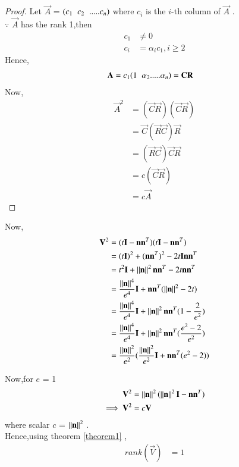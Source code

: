 \documentclass[journal,12pt,twocolumn]{IEEEtran}
\begin{document}
\begin{proof}
Let $\vec{A}$ = $(c_1 \hspace{0.2cm}  c_2 \hspace{0.2cm} ..... c_n)$ where $c_i$ is the $i$-th column of $\vec{A}$ . 
\\
$\because$ $\vec{A}$ has the rank 1,then 
\begin{align}
    c_1 &\neq 0
    \\
    c_i &= \alpha_ic_1 , i\geq 2
\end{align}
Hence,
\begin{align}
    \vec{A} &= c_1(1 \hspace{0.2cm} \alpha_2 .....\alpha_n) = \vec{C}\vec{R}
\end{align}
Now,
\begin{align}
    \vec{A}^2 &= (\vec{C}\vec{R})(\vec{C}\vec{R})
    \\
    &= \vec{C}(\vec{R}\vec{C})\vec{R}
    \\
    &= (\vec{R}\vec{C})\vec{C}\vec{R}
    \\
    &= c(\vec{C}\vec{R})
    \\
    &= c\vec{A}
\end{align}
\end{proof}
Now,
\begin{align}
    \vec{V}^2 &= (t\vec{I}-\vec{n}\vec{n}^T)(t\vec{I}-\vec{n}\vec{n}^T) 
    \\
    &= (t\vec{I})^2 +(\vec{n}\vec{n}^T)^2 - 2t\vec{I}\vec{n}\vec{n}^T
    \\
    &= t^2\vec{I} + \norm{\vec{n}}^2\vec{n}\vec{n}^T - 2t\vec{n}\vec{n}^T
    \\
    &= \frac{\norm{\vec{n}}^4}{e^4}\vec{I} + \vec{n}\vec{n}^T(\norm{\vec{n}}^2-2t)
    \\
    &= \frac{\norm{\vec{n}}^4}{e^4}\vec{I} + \norm{\vec{n}}^2\vec{n}\vec{n}^T(1-\frac{2}{e^2})
    \\
    &= \frac{\norm{\vec{n}}^4}{e^4}\vec{I} + \norm{\vec{n}}^2\vec{n}\vec{n}^T(\frac{e^2-2}{e^2})
    \\
    &= \frac{\norm{\vec{n}}^2}{e^2}(\frac{\norm{\vec{n}}^2}{e^2}\vec{I} + \vec{n}\vec{n}^T(e^2-2))
\end{align}

Now,for $e$ = 1
\begin{align}
    \vec{V}^2 &= \norm{\vec{n}}^2(\norm{\vec{n}}^2\vec{I} - \vec{n}\vec{n}^T)
    \\
    \implies \vec{V}^2 &= c\vec{V}
\end{align}
where scalar $c$ = $\norm{\vec{n}}^2$ .
\\
Hence,using theorem \ref{theorem1} ,
\begin{align}
    rank(\vec{V}) &= 1
\end{align}
\end{document}
